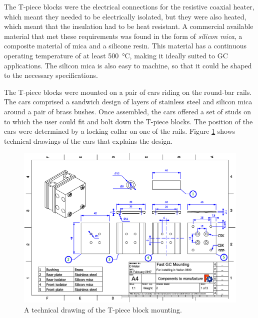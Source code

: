 The T-piece blocks were the electrical connections for the resistive coaxial heater,
which meant they needed to be electrically isolated, but they were also heated,
which meant that the insulation had to be heat resistant. A commercial available
material that met these requirements was found in the form of \textit{silicon
mica}, a composite material of mica and a silicone resin. This material has a
continuous operating temperature of at least \SI{500}{\celsius}, making it
ideally suited to GC applications. The silicon mica is also easy to machine, so
that it could he shaped to the necessary specifications.

The T-piece blocks were mounted on a pair of cars riding on the round-bar rails.
The cars comprised a sandwich design of layers of stainless steel and silicon
mica around a pair of brass bushes. Once assembled, the cars offered a set of
studs on to which the user could fit and bolt down the T-piece blocks. The
position of the cars were determined by a locking collar on one of the rails.
Figure \ref{fig:CarsDrawing1} shows technical drawings of the cars that explains
the design.

\begin{figure}
	\centering
	\includegraphics[angle=90, origin=c, scale=0.75]{Figures/CarDrawing1.pdf}
	\decoRule	
	\caption[Technical drawing of coaxial heater mounting.]{A technical drawing of the T-piece block mounting.} 
	\label{fig:CarsDrawing1}
\end{figure}


